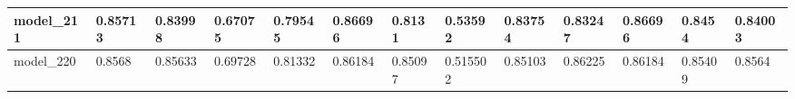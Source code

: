 \begin{tabular}{|l|l|l|l|l|l|l|l|l|l|l|l|l|}
model\_211     & 0.85713     & 0.83998        & 0.67075      & 0.79545          & 0.86696              & 0.8131               & 0.53592      & 0.83754           & 0.83247            & 0.86696         & 0.8454      & 0.84003      \\ \hline
model\_220     & 0.8568      & 0.85633        & 0.69728      & 0.81332          & 0.86184              & 0.85097              & 0.515502     & 0.85103           & 0.86225            & 0.86184         & 0.85409     & 0.8564       \\ \hline
\end{tabular}